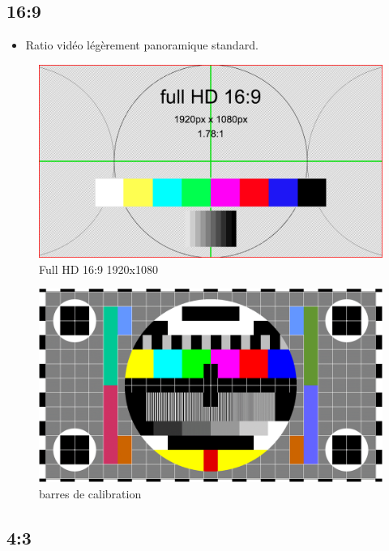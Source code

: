 \documentclass[
  french,
]{book}
\providecommand{\tightlist}{%
  \setlength{\itemsep}{0pt}\setlength{\parskip}{0pt}}
\begin{document}
\hypertarget{section-1}{%
\subsection{16:9}\label{section-1}}

\begin{itemize}
\tightlist
\item
  Ratio vidéo légèrement panoramique standard.
\end{itemize}

\begin{figure}
\centering
\includegraphics{medias/lexique/fullHD_16_9_1920x1080.png}
\caption{Full HD 16:9 1920x1080}
\end{figure}

\begin{figure}
\centering
\includegraphics{medias/lexique/barre_couleurs-1600x900.png}
\caption{barres de calibration}
\end{figure}

\hypertarget{section-2}{%
\subsection{4:3}\label{section-2}}
\end{document}
